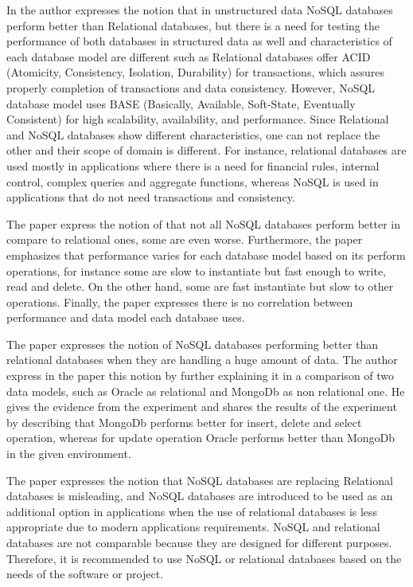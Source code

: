 \documentclass[sigconf,nonacm]{acmart}
\begin{document}
In \cite{14} the author expresses the notion that in unstructured data NoSQL databases perform better than Relational databases, but there is a need for testing the performance of both databases in structured data as well and characteristics of each database model are different such as Relational databases offer ACID (Atomicity, Consistency, Isolation, Durability) for transactions, which assures properly completion of transactions and data consistency. However, NoSQL database model uses BASE (Basically, Available, Soft-State, Eventually Consistent)  for high scalability, availability, and performance. Since Relational and NoSQL databases show different characteristics, one can not replace the other and their scope of domain is different. For instance, relational databases are used mostly in applications where there is a need for financial rules, internal control, complex queries and aggregate functions, whereas NoSQL is used in applications that do not need transactions and consistency.

The paper \cite{3} express the notion of that not all NoSQL databases perform better in compare to relational ones, some are even worse. Furthermore, the paper emphasizes that performance varies for each database model based on its perform operations, for instance some are slow to instantiate but fast enough to write, read and delete. On the other hand, some are fast instantiate but slow to other operations. Finally, the paper expresses there is no correlation between performance and data model each database uses.

The paper \cite{8} expresses the notion of NoSQL databases performing better than relational databases when they are handling a huge amount of data. The author express in the paper this notion by further explaining it in a comparison of two data models, such as Oracle as relational and MongoDb as non relational one. He gives the evidence from the experiment and shares the results of the experiment by describing that MongoDb performs better for insert, delete and select operation, whereas for update operation Oracle performs better than MongoDb in the given environment.

The paper \cite{16} expresses the notion that NoSQL databases are replacing Relational databases is misleading, and NoSQL databases are introduced to be used as an additional option in applications when the use of relational databases is less appropriate due to modern applications requirements. NoSQL and relational databases are not comparable because they are designed for different purposes. Therefore, it is recommended to use NoSQL or relational databases based on the needs of the software or project.
\end{document}
